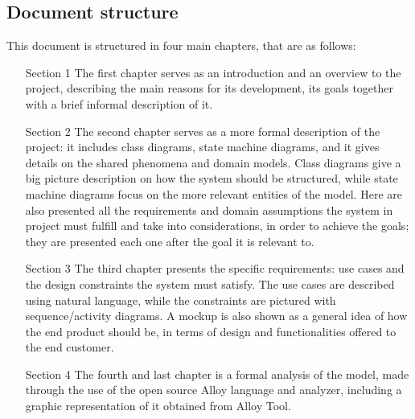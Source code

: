 \subsection{Document structure}
This document is structured in four main chapters, that are as follows:
\begin{enumerate}
    \item[Section 1] The first chapter serves as an introduction and an overview to the project, describing the main reasons for its development, its goals together with a brief informal description of it.

    \item[Section 2] The second chapter serves as a more formal description of the project: it includes class diagrams, state machine diagrams, and it gives details on the shared phenomena and domain models. Class diagrams give a big picture description on how the system should be structured, while state machine diagrams focus on the more relevant entities of the model. Here are also presented all the requirements and domain assumptions the system in project must fulfill and take into considerations, in order to achieve the goals; they are presented each one after the goal it is relevant to.

    \item[Section 3] The third chapter presents the specific requirements: use cases and the design constraints the system must satisfy. The use cases are described using natural language, while the constraints are pictured with sequence/activity diagrams. A mockup is also shown as a general idea of how the end product should be, in terms of design and functionalities offered to the end customer.

    \item[Section 4] The fourth and last chapter is a formal analysis of the model, made through the use of the open source Alloy language and analyzer, including a graphic representation of it obtained from Alloy Tool.
\end{enumerate}
